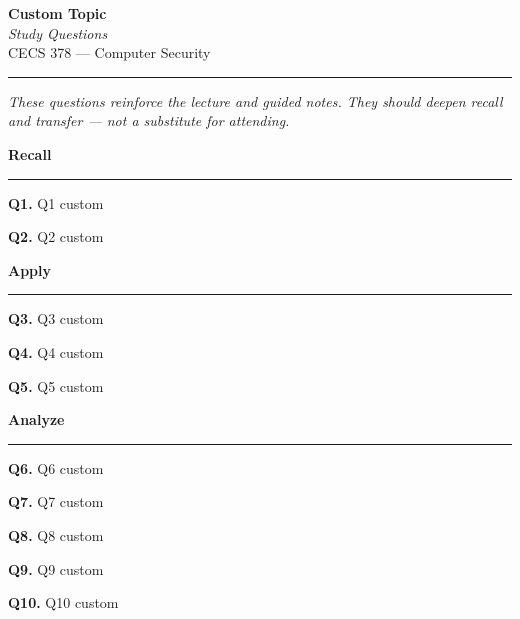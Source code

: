 \documentclass[12pt]{article}
\begin{document}
\thispagestyle{fancy}

{\color{instrNavy}\LARGE\textbf{Custom Topic}}\\[0.3em]
{\large\textit{Study Questions}}\\[0.1em]
{\normalsize CECS 378 — Computer Security}\\[0.5em]
{\color{instrNavy}\rule{\linewidth}{1.5pt}}
\vspace{0.5em}

\noindent\textit{These questions reinforce the lecture and guided notes. They should deepen recall and transfer — not a substitute for attending.}


{\color{instrNavy}\large\textbf{Recall}}
{\color{instrNavy}\rule{\linewidth}{0.4pt}}

\noindent\textbf{Q1.} Q1 custom

\vspace{2em}

\noindent\textbf{Q2.} Q2 custom

\vspace{2em}


{\color{instrNavy}\large\textbf{Apply}}
{\color{instrNavy}\rule{\linewidth}{0.4pt}}

\noindent\textbf{Q3.} Q3 custom

\vspace{3em}

\noindent\textbf{Q4.} Q4 custom

\vspace{3em}

\noindent\textbf{Q5.} Q5 custom

\vspace{3em}


{\color{instrNavy}\large\textbf{Analyze}}
{\color{instrNavy}\rule{\linewidth}{0.4pt}}

\noindent\textbf{Q6.} Q6 custom

\vspace{4em}

\noindent\textbf{Q7.} Q7 custom

\vspace{4em}

\noindent\textbf{Q8.} Q8 custom

\vspace{4em}

\noindent\textbf{Q9.} Q9 custom

\vspace{4em}

\noindent\textbf{Q10.} Q10 custom

\vspace{4em}
\end{document}
